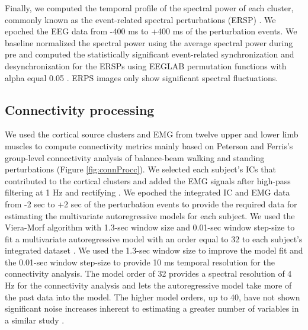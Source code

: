 \documentclass[../thesis_seyed.tex]{subfiles}
\begin{document}
Finally, we computed the temporal profile of the spectral power of each cluster, commonly known as the event-related spectral perturbations (ERSP) \cite{Makeig1993-jx}. We epoched the EEG data from -400 ms to +400 ms of the perturbation events. We baseline normalized the spectral power using the average spectral power during pre and computed the statistically significant event-related synchronization and desynchronization for the ERSPs using EEGLAB permutation functions with alpha equal 0.05 \cite{Pfurtscheller1999-oi}. ERPS images only show significant spectral fluctuations.

\subsection{Connectivity processing}
We used the cortical source clusters and EMG from twelve upper and lower limb muscles to compute connectivity metrics mainly based on Peterson and Ferris's group-level connectivity analysis of balance-beam walking and standing perturbations \cite{Peterson2019-wz} (Figure \ref{fig:connProcc}).  We selected each subject's ICs that contributed to the cortical clusters and added the EMG signals after high-pass filtering at 1 Hz and rectifying \cite{Myers2003-dv}. We epoched the integrated IC and EMG data from -2 sec to +2 sec of the perturbation events to provide the required data for estimating the multivariate autoregressive models for each subject. We used the Viera-Morf algorithm with 1.3-sec window size and 0.01-sec window step-size to fit a multivariate autoregressive model with an order equal to 32 to each subject's integrated dataset \cite{Marple1989-wh,Cohen2014-vt}. We used the 1.3-sec window size to improve the model fit and the 0.01-sec window step-size to provide 10 ms temporal resolution for the connectivity analysis. The model order of 32 provides a spectral resolution of 4 Hz for the connectivity analysis and lets the autoregressive model take more of the past data into the model. The higher model orders, up to 40, have not shown significant noise increases inherent to estimating a greater number of variables in a similar study \cite{Peterson2019-wz}.
\end{document}
